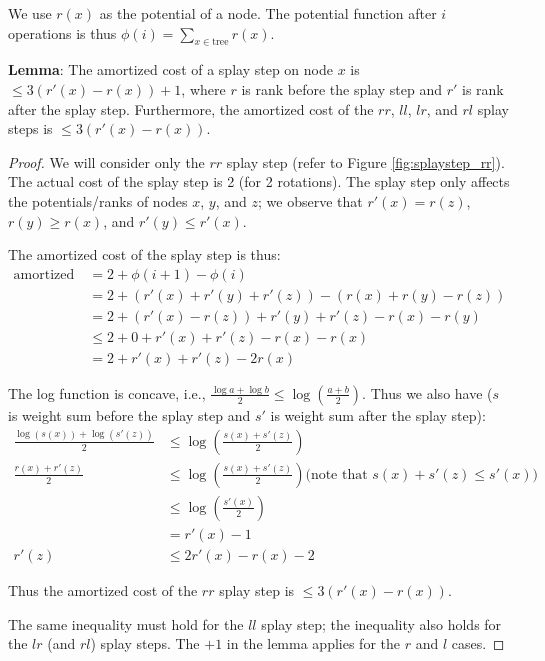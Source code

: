 \documentclass{article}
\begin{document}
We use $r(x)$ as the potential of a node. The potential function
after $i$ operations is thus
$\phi(i) = \sum_{x \in \textrm{tree}} r(x)$.

\textbf{Lemma}:
The amortized cost of a splay step on node $x$ is
$\le 3(r'(x) - r(x)) + 1$, where $r$ is rank before the
splay step and $r'$ is rank after the splay step. Furthermore,
the amortized cost of the $rr$, $ll$, $lr$, and $rl$ splay steps
is $\le 3(r'(x) - r(x))$.

\begin{proof}

We will consider only the $rr$ splay step (refer to
Figure \ref{fig:splaystep_rr}). The actual cost of the
splay step is 2 (for 2 rotations). The splay step only affects
the potentials/ranks of nodes $x$, $y$, and $z$; we observe that
$r'(x) = r(z)$, $r(y) \ge r(x)$, and $r'(y) \le r'(x)$.

The amortized cost of the splay step is thus:
\begin{align*}
  \textrm{amortized cost} & = 2 + \phi(i + 1) - \phi(i) \\
  & = 2 + (r'(x) + r'(y) + r'(z)) - (r(x) + r(y) - r(z)) \\
  & = 2 + (r'(x) - r(z)) + r'(y) + r'(z) - r(x) - r(y) \\
  & \le 2 + 0 + r'(x) + r'(z) - r(x) - r(x) \\
  & = 2 + r'(x) + r'(z) - 2r(x)
\end{align*}

The log function is concave, i.e., $\frac{\log a + \log b}{2} \le
\log\left(\frac{a + b}{2}\right)$. Thus we also have ($s$ is
weight sum before the splay step and $s'$ is weight sum after the
splay step):
\begin{align*}
  \frac{\log(s(x)) + \log(s'(z))}{2} & \le
    \log\left(\frac{s(x) + s'(z)}{2}\right) \\
  \frac{r(x) + r'(z)}{2} & \le
    \log\left(\frac{s(x) + s'(z)}{2}\right)
    \textrm{(note that $s(x) + s'(z) \le s'(x)$)}\\
  & \le \log\left(\frac{s'(x)}{2}\right) \\
  & = r'(x) - 1 \\
  r'(z) & \le 2r'(x) - r(x) - 2
\end{align*}

Thus the amortized cost of the $rr$ splay step is
$\le 3(r'(x) - r(x))$.

The same inequality must hold for the $ll$ splay step; the inequality
also holds for the $lr$ (and $rl$) splay steps. The $+ 1$
in the lemma applies for the $r$ and $l$ cases.

\end{proof}
\end{document}

